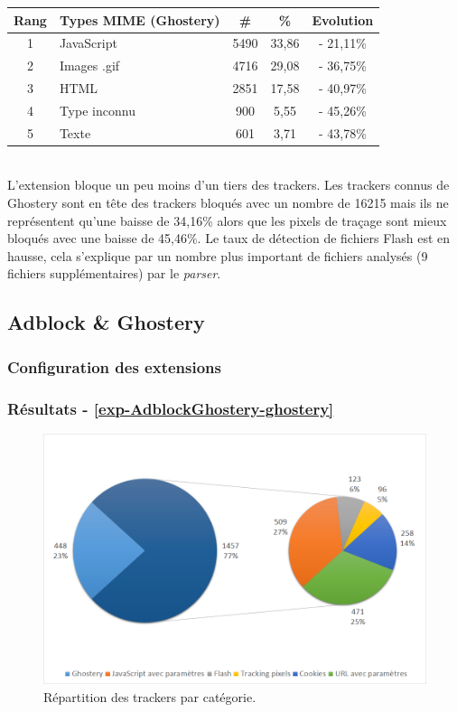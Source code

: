 \begin{tabular}{ c | p{5cm} | c | c | c | }
   Rang & Types MIME (Ghostery) & \# & \% & Evolution\\
   \hline
   \hline
   1 & JavaScript & 5490 & 33,86 & - 21,11\% \\
   2 & Images .gif & 4716 & 29,08 & - 36,75\% \\
   3 & HTML & 2851 & 17,58 & - 40,97\% \\
   4 & Type inconnu & 900 & 5,55 & - 45,26\% \\
   5 & Texte & 601 & 3,71 & - 43,78\% \\
   \hline
\end{tabular}
\\[.3cm]

L'extension bloque un peu moins d'un tiers des trackers. Les trackers connus de Ghostery sont en tête des trackers bloqués avec un nombre de 16215 mais ils ne représentent qu'une baisse de 34,16\% alors que les pixels de traçage sont mieux bloqués avec une baisse de 45,46\%. Le taux de détection de fichiers Flash est en hausse, cela s'explique par un nombre plus important de fichiers analysés (9 fichiers supplémentaires) par le \textit{parser}.


\subsection{Adblock \& Ghostery}
\subsubsection{Configuration des extensions}

\subsubsection{Résultats - \autoref{exp-AdblockGhostery-ghostery}}
\begin{figure}[!h]
	\centering
	\includegraphics[scale=.6]{resultats/ANALYSES/Images/AdblockGhostery-Ghostery.png}
	\caption{\label{exp-AdblockGhostery-ghostery}Répartition des trackers par catégorie.}
\end{figure}

